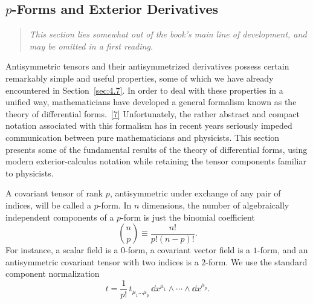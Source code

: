 
\subsection{\texorpdfstring{\(p\)-Forms}{p-Forms} and Exterior
Derivatives\optionalreading}\label{sec:4.11}

\begin{quote}
\small\itshape
This section lies somewhat out of the book's main line of development, and
may be omitted in a first reading.
\end{quote}

Antisymmetric tensors and their antisymmetrized derivatives possess certain
remarkably simple and useful properties, some of which we have already
encountered in Section~\ref{sec:4.7}. In order to deal with these properties
in a unified way, mathematicians have developed a general formalism known as
the theory of differential forms.~\hyperref[ch4-ref-7]{[7]} Unfortunately,
the rather abstract and compact notation associated with this formalism has
in recent years seriously impeded communication between pure mathematicians
and physicists. This section presents some of the fundamental results of the
theory of differential forms, using modern exterior-calculus notation while
retaining the tensor components familiar to physicists.

A covariant tensor of rank \(p\), antisymmetric under exchange of any pair of
indices, will be called a \(p\)-form. In \(n\) dimensions, the number of
algebraically independent components of a \(p\)-form is just the binomial
coefficient
\begin{equation}
  \binom{n}{p}
  \equiv
  \frac{n!}{p!(n-p)!}.
  \tag{4.11.1}\label{eq:4.11.1}
\end{equation}
For instance, a scalar field is a \(0\)-form, a covariant vector field is a
\(1\)-form, and an antisymmetric covariant tensor with two indices is a
\(2\)-form. We use the standard component normalization
\[
  t
  =
  \frac{1}{p!}\,
  t_{\mu_1\ldots\mu_p}\,
  \dd x^{\mu_1}\wedge\cdots\wedge\dd x^{\mu_p}.
\]

